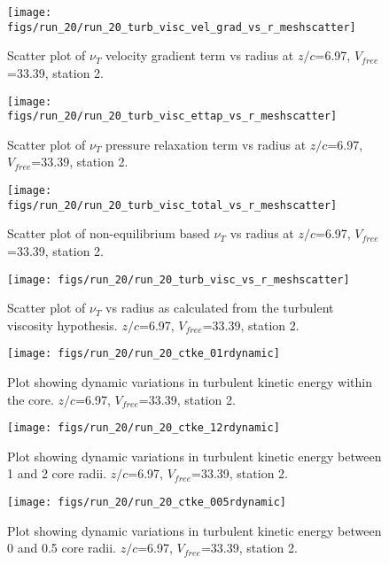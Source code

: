 \begin{figure}[H]
\centering
\texttt{[image: figs/run\_20/run\_20\_turb\_visc\_vel\_grad\_vs\_r\_meshscatter]}
\caption{Scatter plot of $\nu_T$ velocity gradient term vs radius at $z/c$=6.97, $V_{free}$=33.39, station 2.}
\end{figure}


\begin{figure}[H]
\centering
\texttt{[image: figs/run\_20/run\_20\_turb\_visc\_ettap\_vs\_r\_meshscatter]}
\caption{Scatter plot of $\nu_T$ pressure relaxation term vs radius at $z/c$=6.97, $V_{free}$=33.39, station 2.}
\end{figure}


\begin{figure}[H]
\centering
\texttt{[image: figs/run\_20/run\_20\_turb\_visc\_total\_vs\_r\_meshscatter]}
\caption{Scatter plot of non-equilibrium based $\nu_T$ vs radius at $z/c$=6.97, $V_{free}$=33.39, station 2.}
\end{figure}


\begin{figure}[H]
\centering
\texttt{[image: figs/run\_20/run\_20\_turb\_visc\_vs\_r\_meshscatter]}
\caption{Scatter plot of $\nu_T$ vs radius as calculated from the turbulent viscosity hypothesis. $z/c$=6.97, $V_{free}$=33.39, station 2.}
\end{figure}


\begin{figure}[H]
\centering
\texttt{[image: figs/run\_20/run\_20\_ctke\_01rdynamic]}
\caption{Plot showing dynamic variations in turbulent kinetic energy within the core. $z/c$=6.97, $V_{free}$=33.39, station 2.}
\end{figure}


\begin{figure}[H]
\centering
\texttt{[image: figs/run\_20/run\_20\_ctke\_12rdynamic]}
\caption{Plot showing dynamic variations in turbulent kinetic energy between 1 and 2 core radii. $z/c$=6.97, $V_{free}$=33.39, station 2.}
\end{figure}


\begin{figure}[H]
\centering
\texttt{[image: figs/run\_20/run\_20\_ctke\_005rdynamic]}
\caption{Plot showing dynamic variations in turbulent kinetic energy between 0 and 0.5 core radii. $z/c$=6.97, $V_{free}$=33.39, station 2.}
\end{figure}


